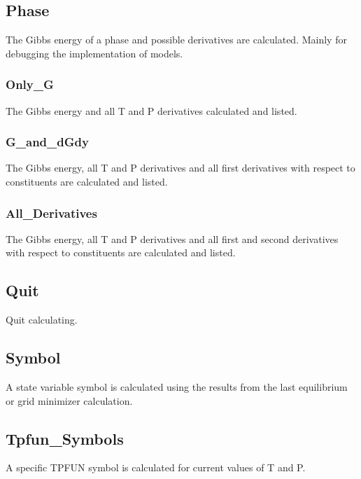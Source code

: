\documentclass[12pt]{article}
\begin{document}
\subsection{Phase}

The Gibbs energy of a phase and possible derivatives are calculated.
Mainly for debugging the implementation of models.

\subsubsection{Only\_G}

The Gibbs energy and all T and P derivatives calculated and listed.

\subsubsection{G\_and\_dGdy}

The Gibbs energy, all T and P derivatives and all first
derivatives with respect to constituents are calculated and listed.

\subsubsection{All\_Derivatives}

The Gibbs energy, all T and P derivatives and all first and second
derivatives with respect to constituents are calculated and listed.

\subsection{Quit}

Quit calculating.

\subsection{Symbol}

A state variable symbol is calculated using the results from the
last equilibrium or grid minimizer calculation.

\subsection{Tpfun\_Symbols}

A specific TPFUN symbol is calculated for current values of T and P.
\end{document}
